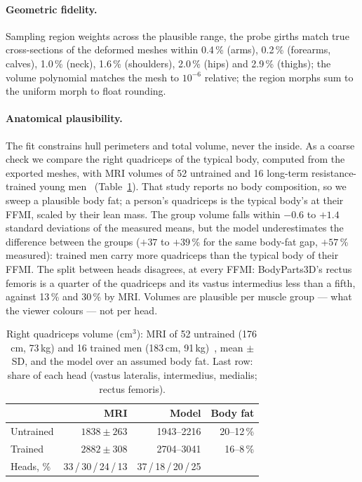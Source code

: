\documentclass[10pt,twocolumn]{article}
\begin{document}
\paragraph{Geometric fidelity.}
Sampling region weights across the plausible range, the probe girths match true cross-sections of
the deformed meshes within 0.4\,\% (arms), 0.2\,\% (forearms, calves), 1.0\,\% (neck), 1.6\,\%
(shoulders), 2.0\,\% (hips) and 2.9\,\% (thighs); the volume polynomial matches the mesh to
$10^{-6}$ relative; the region morphs sum to the uniform morph to float rounding.

\paragraph{Anatomical plausibility.}
The fit constrains hull perimeters and total volume, never the inside. As a coarse check we compare
the right quadriceps of the typical body, computed from the exported meshes, with MRI volumes of 52
untrained and 16 long-term resistance-trained young men~\cite{madenwilkinson2020strong}
(Table~\ref{tab:mri}). That study reports no body composition, so we sweep a plausible body fat;
a person's quadriceps is the typical body's at their FFMI, scaled by their lean mass. The group
volume falls within $-0.6$ to $+1.4$ standard deviations of the measured means, but the model
underestimates the difference between the groups ($+37$ to $+39$\,\% for the same body-fat gap,
$+57$\,\% measured): trained men carry more quadriceps than the typical body of their FFMI. The
split between heads disagrees, at every FFMI: BodyParts3D's rectus femoris is a quarter of the
quadriceps and its vastus intermedius less than a fifth, against 13\,\% and 30\,\% by MRI. Volumes
are plausible per muscle group --- what the viewer colours --- not per head.

\begin{table}[t]
\centering\small
\setlength{\tabcolsep}{4pt}
\caption{Right quadriceps volume (cm$^3$): MRI of 52 untrained (176\,cm, 73\,kg) and 16 trained men
(183\,cm, 91\,kg)~\cite{madenwilkinson2020strong}, mean $\pm$ SD, and the model over an assumed body fat.
Last row: share of each head (vastus lateralis, intermedius, medialis; rectus femoris).}
\label{tab:mri}
\begin{tabular}{@{}lrrr@{}}
\toprule
 & MRI & Model & Body fat\\
\midrule
Untrained & $1838\pm263$ & 1943--2216 & 20--12\,\%\\
Trained & $2882\pm308$ & 2704--3041 & 16--8\,\%\\
\midrule
Heads, \% & 33\,/\,30\,/\,24\,/\,13 & 37\,/\,18\,/\,20\,/\,25 & \\
\bottomrule
\end{tabular}
\end{table}
\end{document}
